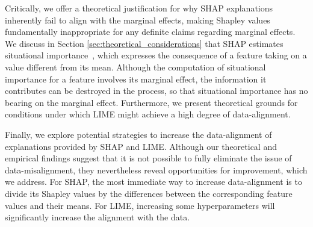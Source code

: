 \documentclass[mnsc,blindrev]{informs3}
\begin{document}
Critically, we offer a theoretical justification for why SHAP explanations inherently fail to align with the marginal effects, making Shapley values fundamentally inappropriate for any definite claims regarding marginal effects. We discuss in Section \ref{sec:theoretical_considerations} that SHAP estimates situational importance~\citep{StrumbeljErik2014Epma}, 
 which expresses the consequence of a feature taking on a value different from its mean. Although the computation of situational importance for a feature involves its marginal effect, the information it contributes can be destroyed in the process, so that situational importance has no bearing on the marginal effect. Furthermore, we present theoretical grounds for conditions under which LIME might achieve a high degree of data-alignment.




Finally, we explore potential strategies to increase the data-alignment of explanations provided by SHAP and LIME. Although our theoretical and empirical findings suggest that it is not possible to fully eliminate the issue of data-misalignment, they nevertheless reveal opportunities for improvement, which we address. For SHAP, the most immediate way to increase data-alignment is to divide its Shapley values by the differences between the corresponding feature values and their means. For LIME, increasing some hyperparameters will significantly increase the alignment with the data.
\end{document}
